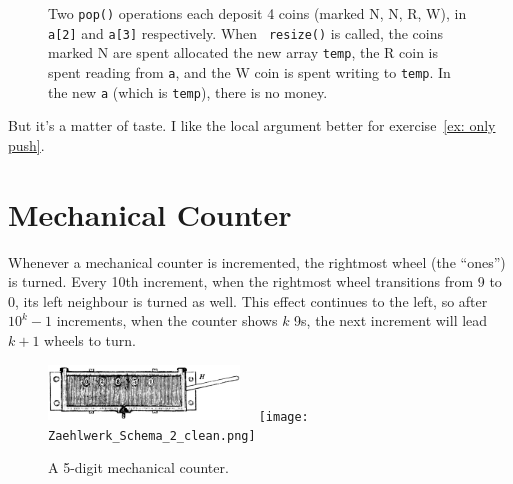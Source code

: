 \documentclass{tufte-handout}
\begin{document}
\begin{figure}
  \caption{ Two {\tt pop()} operations each deposit 4 coins (marked N, N, R,
    W), in {\tt a[2]} and {\tt a[3]} respectively.  When {\tt
      resize()} is called, the coins marked N are spent allocated the
    new array {\tt temp}, the R coin is spent reading from {\tt a},
    and the W coin is spent writing to {\tt temp}. In the new {\tt a}
    (which is {\tt temp}), there is no money.  }
\end{figure}

But it's a matter of taste. I like the local argument better for
exercise~\ref{ex: only push}.


\section{Mechanical Counter}

Whenever a mechanical counter is incremented, the rightmost wheel (the
``ones'') is turned. Every 10th increment, when the rightmost wheel
transitions from 9 to 0, its left neighbour is turned as well. This
effect continues to the left, so after $10^k-1$ increments, when the
counter shows $k$ 9s, the next increment will lead $k+1$ wheels to
turn.

\begin{figure}[htb]
\centerline{\includegraphics[width=2in]{Zaehlwerk_Schema_1.jpg}
$\quad$\texttt{[image: Zaehlwerk\_Schema\_2\_clean.png]}}
\caption{A 5-digit mechanical counter.}
\end{figure}
\end{document}
